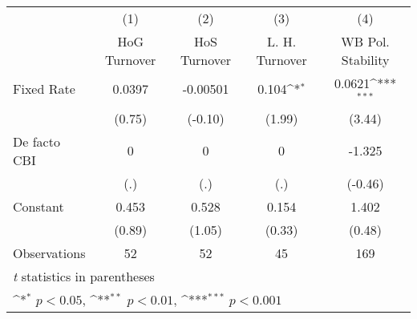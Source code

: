 \begin{table}[htbp]\centering
\def\sym#1{\ifmmode^{#1}\else\(^{#1}\)\fi}
\caption{\label{hiKfivs4}}
\begin{tabular}{l*{4}{c}}
\toprule
                                        &\multicolumn{1}{c}{(1)}&\multicolumn{1}{c}{(2)}&\multicolumn{1}{c}{(3)}&\multicolumn{1}{c}{(4)}\\
                                        &\multicolumn{1}{c}{HoG Turnover}&\multicolumn{1}{c}{HoS Turnover}&\multicolumn{1}{c}{L. H. Turnover}&\multicolumn{1}{c}{WB Pol. Stability}\\
\midrule
Fixed Rate                              &   0.0397         & -0.00501         &    0.104\sym{*}  &   0.0621\sym{***}\\
                                        &   (0.75)         &  (-0.10)         &   (1.99)         &   (3.44)         \\
\addlinespace
De facto CBI                            &        0         &        0         &        0         &   -1.325         \\
                                        &      (.)         &      (.)         &      (.)         &  (-0.46)         \\
\addlinespace
Constant                                &    0.453         &    0.528         &    0.154         &    1.402         \\
                                        &   (0.89)         &   (1.05)         &   (0.33)         &   (0.48)         \\
\midrule
Observations                            &       52         &       52         &       45         &      169         \\
\bottomrule
\multicolumn{5}{l}{\footnotesize \textit{t} statistics in parentheses}\\
\multicolumn{5}{l}{\footnotesize \sym{*} \(p<0.05\), \sym{**} \(p<0.01\), \sym{***} \(p<0.001\)}\\
\end{tabular}
\end{table}
